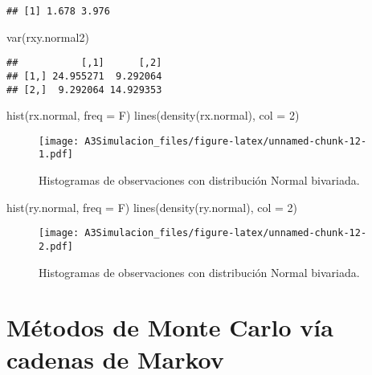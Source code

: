 \documentclass[
  spanish,
]{book}
\newenvironment{Shaded}{\begin{snugshade}}{\end{snugshade}}
\newcommand{\AttributeTok}[1]{\textcolor[rgb]{0.77,0.63,0.00}{#1}}
\newcommand{\DecValTok}[1]{\textcolor[rgb]{0.00,0.00,0.81}{#1}}
\newcommand{\FunctionTok}[1]{\textcolor[rgb]{0.00,0.00,0.00}{#1}}
\newcommand{\NormalTok}[1]{#1}
\theoremstyle{definition}
\theoremstyle{definition}
\theoremstyle{definition}
\theoremstyle{definition}
\theoremstyle{remark}
\begin{document}
\begin{verbatim}
## [1] 1.678 3.976
\end{verbatim}

\begin{Shaded}
\begin{Highlighting}[]
\FunctionTok{var}\NormalTok{(rxy.normal2)}
\end{Highlighting}
\end{Shaded}

\begin{verbatim}
##           [,1]      [,2]
## [1,] 24.955271  9.292064
## [2,]  9.292064 14.929353
\end{verbatim}

\begin{Shaded}
\begin{Highlighting}[]
\FunctionTok{hist}\NormalTok{(rx.normal, }\AttributeTok{freq =}\NormalTok{ F)}
\FunctionTok{lines}\NormalTok{(}\FunctionTok{density}\NormalTok{(rx.normal), }\AttributeTok{col =} \DecValTok{2}\NormalTok{)}
\end{Highlighting}
\end{Shaded}

\begin{figure}
\centering
\texttt{[image: A3Simulacion\_files/figure-latex/unnamed-chunk-12-1.pdf]}
\caption{\label{fig:unnamed-chunk-12-1}Histogramas de observaciones con distribución Normal bivariada.}
\end{figure}

\begin{Shaded}
\begin{Highlighting}[]
\FunctionTok{hist}\NormalTok{(ry.normal, }\AttributeTok{freq =}\NormalTok{ F)}
\FunctionTok{lines}\NormalTok{(}\FunctionTok{density}\NormalTok{(ry.normal), }\AttributeTok{col =} \DecValTok{2}\NormalTok{)}
\end{Highlighting}
\end{Shaded}

\begin{figure}
\centering
\texttt{[image: A3Simulacion\_files/figure-latex/unnamed-chunk-12-2.pdf]}
\caption{\label{fig:unnamed-chunk-12-2}Histogramas de observaciones con distribución Normal bivariada.}
\end{figure}

\hypertarget{muxe9todos-de-monte-carlo-vuxeda-cadenas-de-markov}{%
\section{Métodos de Monte Carlo vía cadenas de Markov}\label{muxe9todos-de-monte-carlo-vuxeda-cadenas-de-markov}}
\end{document}

